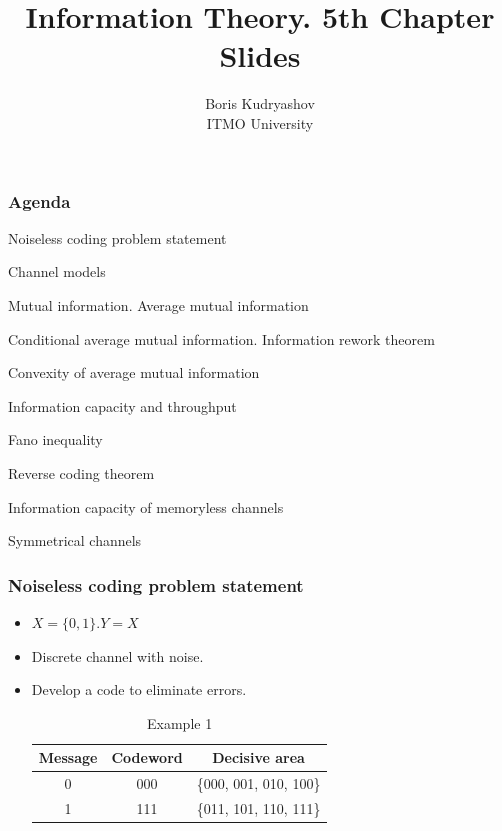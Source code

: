 \documentclass[14pt]{beamer}
\title{\small{Information Theory. 5th Chapter Slides}}
\author{\huge{
Boris Kudryashov \\
\vspace{30pt}
ITMO University
}}
\begin{document}
\maketitle

  

\begin{frame}
\frametitle{Agenda}
\begin{enumerate}
\small{
    \item{Noiseless coding problem statement}
    \item{Channel models}
    \item{Mutual information. Average mutual information}
    \item{Conditional average mutual information. Information rework theorem}
    \item{Convexity of average mutual information}
    \item{Information capacity and throughput}
    \item{Fano inequality}
    \item{Reverse coding theorem}
    \item{Information capacity of memoryless channels}
    \item{Symmetrical channels}
}

\end{enumerate}
\end{frame}


\begin{frame}
\frametitle{Noiseless coding problem statement}
\begin{itemize}

    \item $X=\{0, 1\}. Y = X$
    \item Discrete channel with noise.
    \item Develop a code to eliminate errors.
    
    
    \pause
    \begin{table}[htbp]
    \begin{center}
    \caption{Example 1}
    \begin{tabular}
        {|c|c|c|} \hline %
        Message & Codeword & Decisive area \\ \hline %
        0& 000&   {\{}000, 001, 010, 100{\}} \\ \hline %
        1& 111&   {\{}011, 101, 110, 111{\}} \\ \hline %
    \end{tabular}
    \end{center}
    \end{table}
    

\end{itemize}
\end{frame}
\end{document}
